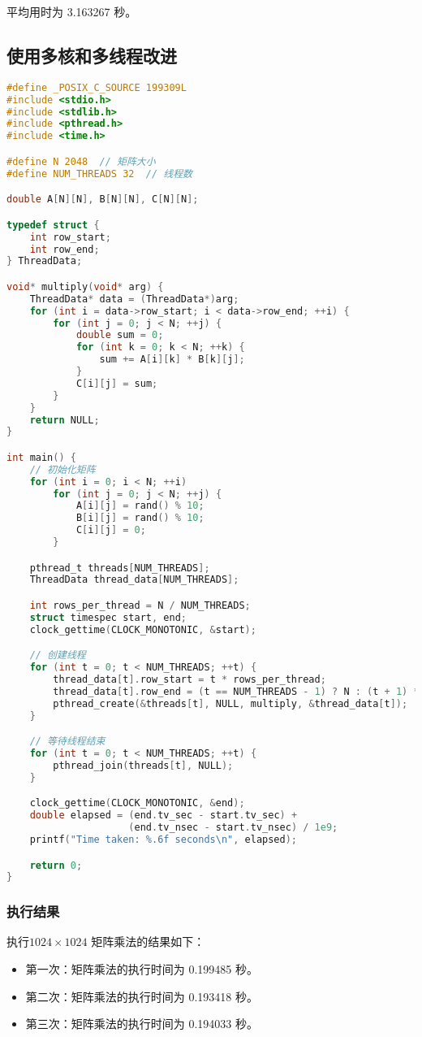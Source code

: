 \documentclass[a4paper,12pt]{ctexart}
\begin{document}
平均用时为 3.163267 秒。

\subsection{使用多核和多线程改进}
\begin{lstlisting}[language=C, caption={多线程矩阵乘法C语言源码}]
#define _POSIX_C_SOURCE 199309L
#include <stdio.h>
#include <stdlib.h>
#include <pthread.h>
#include <time.h>

#define N 2048  // 矩阵大小
#define NUM_THREADS 32  // 线程数

double A[N][N], B[N][N], C[N][N];

typedef struct {
    int row_start;
    int row_end;
} ThreadData;

void* multiply(void* arg) {
    ThreadData* data = (ThreadData*)arg;
    for (int i = data->row_start; i < data->row_end; ++i) {
        for (int j = 0; j < N; ++j) {
            double sum = 0;
            for (int k = 0; k < N; ++k) {
                sum += A[i][k] * B[k][j];
            }
            C[i][j] = sum;
        }
    }
    return NULL;
}

int main() {
    // 初始化矩阵
    for (int i = 0; i < N; ++i)
        for (int j = 0; j < N; ++j) {
            A[i][j] = rand() % 10;
            B[i][j] = rand() % 10;
            C[i][j] = 0;
        }

    pthread_t threads[NUM_THREADS];
    ThreadData thread_data[NUM_THREADS];

    int rows_per_thread = N / NUM_THREADS;
    struct timespec start, end;
    clock_gettime(CLOCK_MONOTONIC, &start);

    // 创建线程
    for (int t = 0; t < NUM_THREADS; ++t) {
        thread_data[t].row_start = t * rows_per_thread;
        thread_data[t].row_end = (t == NUM_THREADS - 1) ? N : (t + 1) * rows_per_thread;
        pthread_create(&threads[t], NULL, multiply, &thread_data[t]);
    }

    // 等待线程结束
    for (int t = 0; t < NUM_THREADS; ++t) {
        pthread_join(threads[t], NULL);
    }

    clock_gettime(CLOCK_MONOTONIC, &end);
    double elapsed = (end.tv_sec - start.tv_sec) + 
                     (end.tv_nsec - start.tv_nsec) / 1e9;
    printf("Time taken: %.6f seconds\n", elapsed);

    return 0;
}
\end{lstlisting}

\subsubsection{执行结果}
执行$1024 \times 1024$ 矩阵乘法的结果如下：
\begin{itemize}
    \item 第一次：矩阵乘法的执行时间为 0.199485 秒。
    \item 第二次：矩阵乘法的执行时间为 0.193418 秒。
    \item 第三次：矩阵乘法的执行时间为 0.194033 秒。
\end{itemize}
\end{document}
